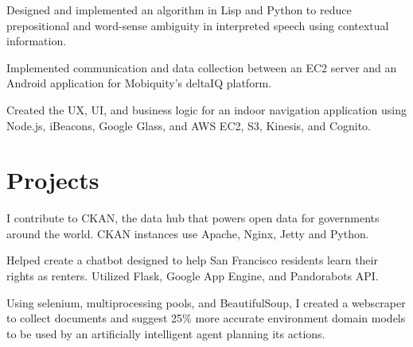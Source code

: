 \documentclass[]{deedy-resume-openfont}
\begin{document}
\begin{minipage}[t]{0.66\textwidth}
\begin{tightemize}
\item Designed and implemented an algorithm in Lisp and Python to reduce prepositional and word-sense ambiguity in interpreted speech using contextual information.
\end{tightemize}
\sectionsep

\begin{tightemize}
\item Implemented communication and data collection between an EC2 server and an Android application for Mobiquity’s deltaIQ platform.

\item Created the UX, UI, and business logic for an indoor navigation application using Node.js, iBeacons, Google Glass, and AWS EC2, S3, Kinesis, and Cognito.
\end{tightemize}


\section{Projects}

\begin{tightemize}
\item I contribute to CKAN, the data hub that powers open data for governments around the world. CKAN instances use Apache, Nginx, Jetty and Python.
\end{tightemize}
\sectionsep

\begin{tightemize}
\item Helped create a chatbot designed to help San Francisco residents learn their rights as renters. Utilized Flask, Google App Engine, and Pandorabots API.
\end{tightemize}
\sectionsep

\begin{tightemize}
\item Using selenium, multiprocessing pools, and BeautifulSoup, I created a webscraper to collect documents and suggest 25\% more accurate environment domain models to be used by an artificially intelligent agent planning its actions. 
\end{tightemize}
\sectionsep


\end{minipage}
\end{document}
